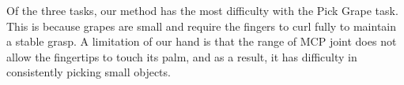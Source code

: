 Of the three tasks, our method has the most difficulty with the Pick Grape task. This is because grapes are small and require the fingers to curl fully to maintain a stable grasp. A limitation of our hand is that the range of MCP joint does not allow the fingertips to touch its palm, and as a result, it has difficulty in consistently picking small objects.
